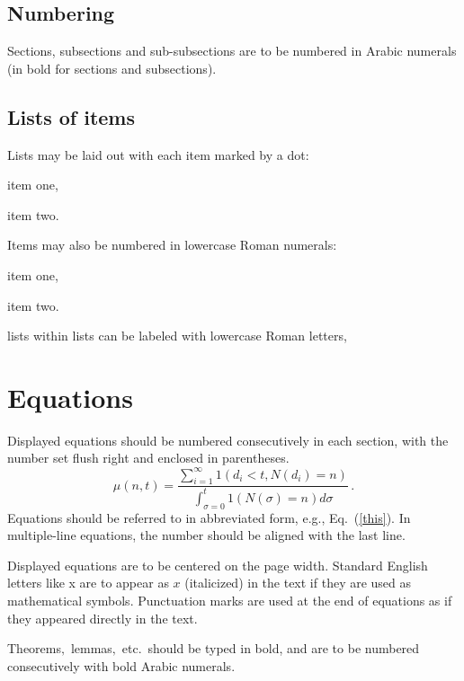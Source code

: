 \documentclass{ws-join}
\begin{document}
\subsection{Numbering}
Sections, subsections and sub-subsections are to be numbered in
Arabic numerals (in bold for sections and subsections).

\subsection{Lists of items}
Lists may be laid out with each item marked by a dot:

\begin{itemlist}
 \item item one,
 \item item two.
\end{itemlist}

Items may also be numbered in lowercase Roman numerals:
\begin{romanlist}[(ii)]
 \item item one,
 \item item two. 
	\begin{romanlist}[(b)]
	\item lists within lists can be labeled with lowercase 
              Roman letters,
	\end{romanlist}
\end{romanlist}

\section{Equations}
Displayed equations should be numbered consecutively in each
section, with the number set flush right and enclosed in
parentheses.
\begin{equation}
\mu(n, t) = \frac{\sum^\infty_{i=1} 1(d_i < t, 
N(d_i) = n)}{\int^t_{\sigma=0} 1(N(\sigma) = n)d\sigma}\,. \label{this}
\end{equation}
Equations should be referred to in abbreviated form, e.g.,
Eq.~(\ref{this}). In multiple-line equations, the number should be 
aligned with the last line.

Displayed equations are to be centered on the page width.
Standard English letters like x are to appear as $x$
(italicized) in the text if they are used as mathematical
symbols. Punctuation marks are used at the end of equations as
if they appeared directly in the text.

\begin{theorem}
Theorems$,$ lemmas$,$ etc.~should be typed in bold, and are 
to be numbered consecutively with bold Arabic numerals.
\end{theorem}
\end{document}
